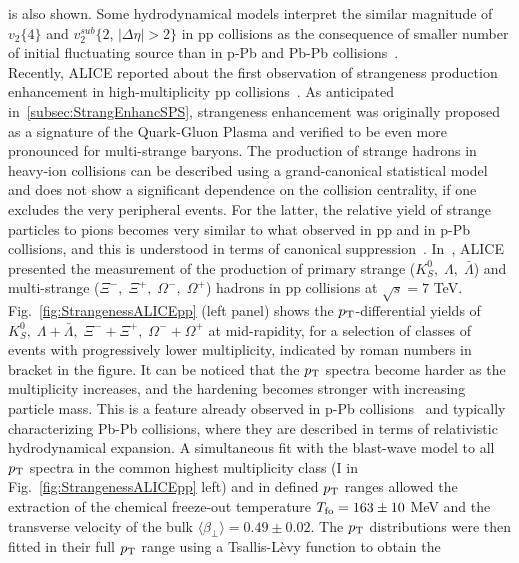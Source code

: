 is also shown. Some hydrodynamical models interpret the similar magnitude 
of $v_2 \{4\}$ and $v_2^{sub} \{2$, $|\Delta \eta| > 2\}$ in pp collisions as the 
consequence of smaller number of initial fluctuating source than in p-Pb and 
Pb-Pb collisions~\cite{Yan:2013laa}.\\
Recently, ALICE reported about the first observation of strangeness production
 enhancement in high-multiplicity pp collisions~\cite{ALICE:2017jyt}. As 
 anticipated in~\ref{subsec:StrangEnhancSPS}, strangeness enhancement 
 was originally proposed as a signature of the Quark-Gluon Plasma and 
 verified to be even more pronounced for multi-strange baryons. The production 
 of strange hadrons in heavy-ion collisions can be described using a 
 grand-canonical statistical model and does not show a significant dependence 
 on the collision centrality, if one excludes the very peripheral events. For the latter,
  the relative yield of strange particles to pions becomes very similar to what 
  observed in pp and in p-Pb~\cite{Abelev:2013haa,Adam:2015vsf} collisions, and this is understood
  in terms of canonical suppression~\cite{Tounsi:2001ck}. In~\cite{ALICE:2017jyt}, ALICE presented the
   measurement of the production of primary strange ($K^0_S,\; \Lambda,\; \bar{\Lambda}$) 
   and multi-strange ($\Xi^-,\; \Xi^+,\; \Omega^-,\; \Omega^+$) hadrons in pp 
   collisions at $\sqrt{s} = 7$ TeV. Fig.~\ref{fig:StrangenessALICEpp} (left panel) 
   shows the $p_{\rm T}$-differential yields of 
   $K^0_S,\; \Lambda + \bar{\Lambda},\; \Xi^- + \Xi^+,\; \Omega^- + \Omega^+$ 
   at mid-rapidity, for a selection of classes of events with progressively lower 
   multiplicity, indicated by roman numbers in bracket in the figure. It can be 
   noticed that the $p_{\rm T}$ spectra become harder as the multiplicity increases, 
   and the hardening becomes stronger with increasing particle mass. This is
    a feature already observed in p-Pb collisions~\cite{Abelev:2013haa} and 
    typically characterizing Pb-Pb collisions, where they are described in terms 
    of relativistic hydrodynamical expansion. A simultaneous fit with the 
    blast-wave model to all $p_{\rm T}$ spectra in the common highest multiplicity class 
    (I in Fig.~\ref{fig:StrangenessALICEpp} left) and in defined $p_{\rm T}$ ranges allowed the 
    extraction of the chemical freeze-out temperature $T_{\rm fo} = 163 \pm 10$ 
    MeV and the transverse velocity of the bulk 
    $\langle \beta_{\perp} \rangle = 0.49 \pm 0.02$. The $p_{\rm T}$ distributions were
     then fitted in their full $p_{\rm T}$ range using a Tsallis-L\`evy function to obtain the 
